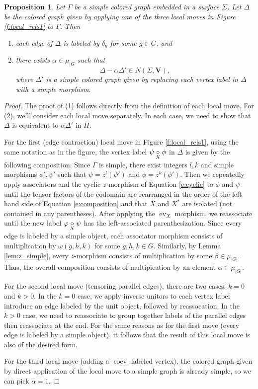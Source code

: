 \documentclass{ws-jktr}
\newtheorem{prop}[thm]{Proposition}
\DeclareMathOperator{\coev}{coev}
\DeclareMathOperator{\ev}{ev}
\newcommand{\VV}{\mathbf{V}}       %
\newcommand{\ph}{\varphi}
\begin{document}
\begin{prop} \label{prop:omega}
Let $\Gamma$ be a simple colored graph embedded in a surface $\Sigma$.  Let $\Delta$ be the colored graph given by applying one of the three local moves in Figure \ref{f:local_rels1} to $\Gamma$.  Then
\begin{enumerate}
\item  each edge of $\Delta$ is labeled by $\delta_g$ for some $g \in G$, and
\item  there exists $\alpha \in \mu_{|G}$ such that 
$$\Delta - \alpha \Delta' \in N(\Sigma, \VV),$$
where $\Delta'$ is a simple colored graph given by replacing each vertex label in $\Delta$ with a simple morphism.
\end{enumerate}
\end{prop}
\begin{proof}
The proof of (1) follows directly from the definition  of each local move. For (2), we'll consider each local move separately.  In each case, we need to show that $\Delta$ is equivalent to $\alpha \Delta'$ in $H$.  

For the first (edge contraction) local move in Figure \ref{f:local_rels1},  using the same notation as in the figure, the vertex label $\psi \underset{\scriptstyle X}{\circ} \phi$ in $\Delta$ is given by the following composition.  Since $\Gamma$ is simple, there exist integers $l,k$ and simple morphisms $\phi', \psi'$ such that $\psi = z^l(\psi')$ and $\phi = z^k(\phi')$. Then we repeatedly apply associators and the cyclic $z$-morphism of Equation \ref{e:cyclic} to $\phi$ and $\psi$ until the tensor factors of the codomain are rearranged in the order of the left hand side of Equation \ref{e:composition} and that $X$ and $X^*$ are isolated (not contained in any parentheses).  After applying the $\ev_X$ morphism, we reassociate until the new label $\ph\cc{X}\psi$ has the left-associated parenthesization.  Since every edge is labeled by a simple object, each associator morphism consists of multiplication by $\omega(g,h,k)$ for some $g,h,k \in G$.  Similarly, by Lemma \ref{lem:z_simple}, every $z$-morphism consists of multiplication by some $\beta \in \mu_{|G|}$.  Thus, the overall composition consists of multipication by an element $\alpha \in \mu_{|G|}$.

For the second local move (tensoring parallel edges), there are two cases: $k = 0$ and $k > 0$.  In the $k = 0$ case,  we apply inverse unitors to each vertex label introduce an edge labeled by the unit object, followed by reassocation.  In the $k > 0$ case, we need to reassociate to group together labels of the parallel edges then reassociate at the end.  For the same reasons as for the first move (every edge is labeled by a simple object), it follows that the result of this local move is also of the desired form.

For the third local move (adding a $\coev$-labeled vertex), the colored graph given by direct application of the local move to a simple graph is already simple, so we can pick $\alpha = 1$.  
\end{proof}
\end{document}
